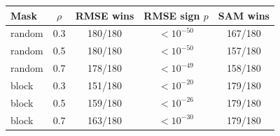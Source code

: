 \begin{tabular}{@{}l c c c c@{}}
\toprule
Mask & \(\rho\) & RMSE wins & RMSE sign \(p\) & SAM wins \\
\midrule
random & 0.3 & 180/180 & \(<10^{-50}\) & 167/180 \\
random & 0.5 & 180/180 & \(<10^{-50}\) & 157/180 \\
random & 0.7 & 178/180 & \(<10^{-49}\) & 158/180 \\
block & 0.3 & 151/180 & \(<10^{-20}\) & 179/180 \\
block & 0.5 & 159/180 & \(<10^{-26}\) & 179/180 \\
block & 0.7 & 163/180 & \(<10^{-30}\) & 179/180 \\
\bottomrule
\end{tabular}
